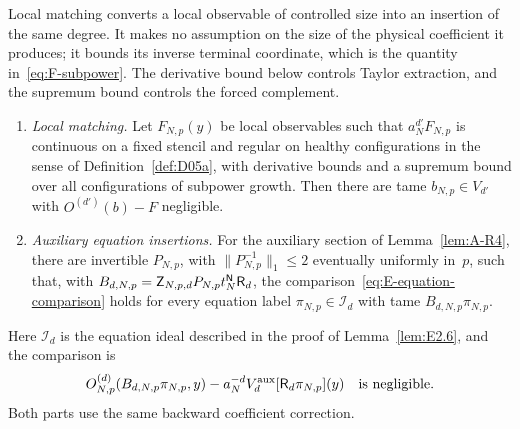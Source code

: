 Local matching converts a local observable of controlled size into an insertion of the same degree. It makes no assumption on the size of the physical coefficient it produces; it bounds its inverse terminal coordinate, which is the quantity in~\eqref{eq:F-subpower}. The derivative bound below controls Taylor extraction, and the supremum bound controls the forced complement.
\begin{lemma}\label{lem:E-local-comparison}
\begin{enumerate}
\item[(i)] \emph{Local matching.} Let $F_{N,p}(y)$ be local observables such that $a_N^{d'}F_{N,p}$ is continuous on a fixed stencil and regular on healthy configurations in the sense of Definition~\ref{def:D05a}, with derivative bounds and a supremum bound over all configurations of subpower growth. Then there are tame $b_{N,p}\in V_{d'}$ with $O^{(d')}(b)-F$ negligible.
\item[(ii)] \emph{Auxiliary equation insertions.} For the auxiliary section of Lemma~\ref{lem:A-R4}, there are invertible $P_{N,p}$, with $\|P_{N,p}^{-1}\|_1\le2$ eventually uniformly in~$p$, such that, with $B_{d,N,p}=\mathsf Z_{N,p,d}P_{N,p}t_N^{\mathsf{N}}\mathsf R_d$, the comparison~\eqref{eq:E-equation-comparison} holds for every equation label $\pi_{N,p}\in\mathcal I_d$ with tame $B_{d,N,p}\pi_{N,p}$.
\end{enumerate}
\end{lemma}
Here $\mathcal I_d$ is the equation ideal described in the proof of Lemma~\ref{lem:E2.6}, and the comparison is
\begin{equation}\label{eq:E-equation-comparison}
 O^{(d)}_{N,p}(B_{d,N,p}\pi_{N,p},y)
 -a_N^{-d}V_d^{\rm aux}[\mathsf R_d\pi_{N,p}](y)
 \quad\text{is negligible}.
\end{equation}
Both parts use the same backward coefficient correction.
